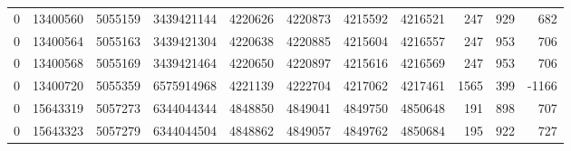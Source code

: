 \begin{tabular}{rrrrrrrrrrr}
0 & 13400560 & 5055159 & 3439421144 & 4220626 & 4220873 & 4215592 & 4216521 & 247 & 929 & 682 \\
0 & 13400564 & 5055163 & 3439421304 & 4220638 & 4220885 & 4215604 & 4216557 & 247 & 953 & 706 \\
0 & 13400568 & 5055169 & 3439421464 & 4220650 & 4220897 & 4215616 & 4216569 & 247 & 953 & 706 \\
0 & 13400720 & 5055359 & 6575914968 & 4221139 & 4222704 & 4217062 & 4217461 & 1565 & 399 & -1166 \\
0 & 15643319 & 5057273 & 6344044344 & 4848850 & 4849041 & 4849750 & 4850648 & 191 & 898 & 707 \\
0 & 15643323 & 5057279 & 6344044504 & 4848862 & 4849057 & 4849762 & 4850684 & 195 & 922 & 727 \\
\bottomrule
\end{tabular}
